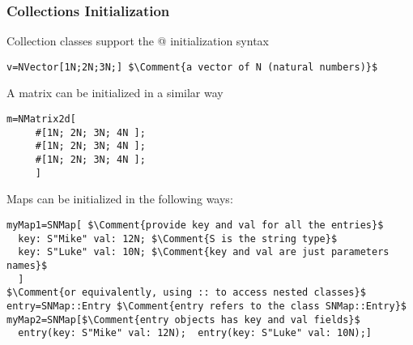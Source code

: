 \begin{frame}[fragile]
\frametitle{Collections Initialization}
Collection classes support the \Q@[...;...;]@ initialization syntax
\begin{NiceCode}{59ex}{0.8}
\begin{lstlisting}
v=NVector[1N;2N;3N;] $\Comment{a vector of N (natural numbers)}$
\end{lstlisting}
\end{NiceCode}
A matrix can be initialized in a similar way
\begin{NiceCode}{59ex}{0.8}
\begin{lstlisting}
m=NMatrix2d[
     #[1N; 2N; 3N; 4N ];
     #[1N; 2N; 3N; 4N ];
     #[1N; 2N; 3N; 4N ];
     ] 
\end{lstlisting}
\end{NiceCode}
Maps can be initialized in the following ways:
\begin{NiceCode}{59ex}{0.8}
\begin{lstlisting}
myMap1=SNMap[ $\Comment{provide key and val for all the entries}$
  key: S"Mike" val: 12N; $\Comment{S is the string type}$
  key: S"Luke" val: 10N; $\Comment{key and val are just parameters names}$
  ]
$\Comment{or equivalently, using :: to access nested classes}$
entry=SNMap::Entry $\Comment{entry refers to the class SNMap::Entry}$
myMap2=SNMap[$\Comment{entry objects has key and val fields}$
  entry(key: S"Mike" val: 12N);  entry(key: S"Luke" val: 10N);]
\end{lstlisting}
\end{NiceCode}
\end{frame}



